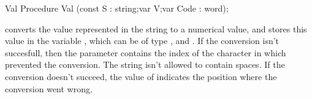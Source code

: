 \documentclass{report}
\begin{document}

\begin{procedure}{Val}
\Declaration
Procedure Val (const S : string;var V;var Code : word);

\Description
{} converts the value represented in the string  to a numerical
value, and stores this value in the variable , which
can be of type ,  and .
If the conversion isn't succesfull, then the parameter  contains
the index of the character in  which prevented the conversion.
The string  isn't allowed to contain spaces.
\Errors
If the conversion doesn't succeed, the value of  indicates the
position where the conversion went wrong.
\SeeAlso
{}
\end{procedure}

\end{document}
